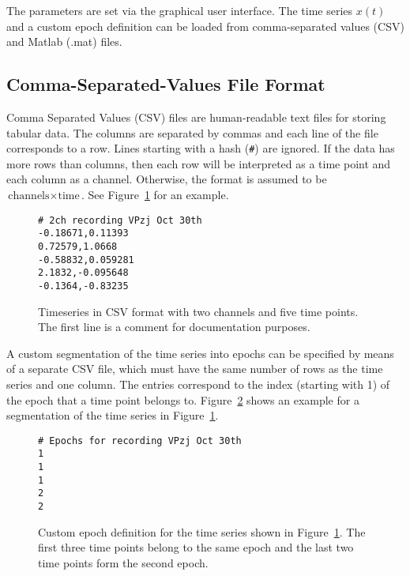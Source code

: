 \documentclass{article}
\newcommand{\1}{\ensuremath{\mathds{1}}}
\newcommand{\0}{\ensuremath{0}}
\begin{document}
The parameters are set via the graphical user interface. The time series 
$x(t)$ and a custom epoch definition can be loaded from comma-separated values
(CSV) and Matlab (.mat) files.

\subsection{Comma-Separated-Values File Format}
\label{sec:csv_input}

Comma Separated Values (CSV) files are human-readable text files for storing tabular data. 
The columns are separated by commas and each line of the file corresponds to a row. 
Lines starting with a hash (\texttt{\#}) are ignored. If the data has more rows than columns,
then each row will be interpreted as a time point and each column as a channel. Otherwise,
the format is assumed to be $\text{channels} \times \text{time}$. See 
Figure~\ref{fig:ex_timeseries} for an example.

\begin{figure}[h]
\centering
\begin{boxedminipage}{10cm}
\begin{verbatim}
# 2ch recording VPzj Oct 30th
-0.18671,0.11393
0.72579,1.0668
-0.58832,0.059281
2.1832,-0.095648
-0.1364,-0.83235
\end{verbatim}
\end{boxedminipage}
\caption{
Timeseries in CSV format with two channels and five time points. 
The first line is a comment for documentation purposes.
\label{fig:ex_timeseries}
}
\end{figure}

A custom segmentation of the time series into epochs can be specified by means of 
a separate CSV file, which must have the same number of rows as the time series 
and one column. The entries correspond to the index (starting with 1) of the 
epoch that a time point belongs to. Figure~\ref{fig:ex_segmentation} shows 
an example for a segmentation of the time series in Figure~\ref{fig:ex_timeseries}.

\begin{figure}[h]
\centering
\begin{boxedminipage}{10cm}
\begin{verbatim}
# Epochs for recording VPzj Oct 30th
1
1
1
2
2
\end{verbatim}
\end{boxedminipage}
\caption{
Custom epoch definition for the time series shown in Figure~\ref{fig:ex_timeseries}. 
The first three time points belong to the same epoch and the last two time points form the
second epoch.
\label{fig:ex_segmentation}
}
\end{figure}
\end{document}
